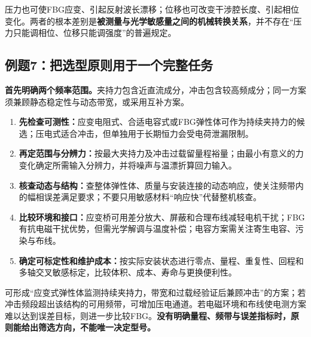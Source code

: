 压力也可使FBG应变、引起反射波长漂移；位移也可改变干涉腔长度、引起相位变化。两者的根本差别是\textbf{被测量与光学敏感量之间的机械转换关系}，并不存在“压力只能调相位、位移只能调强度”的普遍规定。

\Needspace{8cm}
\subsection{例题7：把选型原则用于一个完整任务}


\sol
\textbf{首先明确两个频率范围。}夹持力包含近直流成分，冲击包含较高频成分；同一方案须兼顾静态稳定性与动态带宽，或采用互补方案。

\begin{enumerate}
\item \textbf{先检查可测性：}应变电阻式、合适电容式或FBG弹性体可作为持续夹持力的候选；压电式适合冲击，但单独用于长期恒力会受电荷泄漏限制。
\item \textbf{再定范围与分辨力：}按最大夹持力及冲击过载留量程裕量；由最小有意义的力变化确定所需输入分辨力，并将噪声与温漂折算回力输入。
\item \textbf{核查动态与结构：}查整体弹性体、质量与安装连接的动态响应，使关注频带内的幅相误差满足要求；不要只用敏感材料“响应快”代替整机核查。
\item \textbf{比较环境和接口：}应变桥可用差分放大、屏蔽和合理布线减轻电机干扰；FBG有抗电磁干扰优势，但需光学解调与温度补偿；电容方案需关注寄生电容、污染与布线。
\item \textbf{确定可标定性和维护成本：}按实际安装状态进行零点、量程、重复性、回程和多轴交叉敏感标定，比较体积、成本、寿命与更换便利性。
\end{enumerate}

可形成“应变式弹性体监测持续夹持力，带宽和过载经验证后兼顾冲击”的方案；若冲击频段超出该结构的可用频带，可增加压电通道。若电磁环境和布线使电测方案难以达到误差目标，则进一步比较FBG。\textbf{没有明确量程、频带与误差指标时，原则能给出筛选方向，不能唯一决定型号。}

